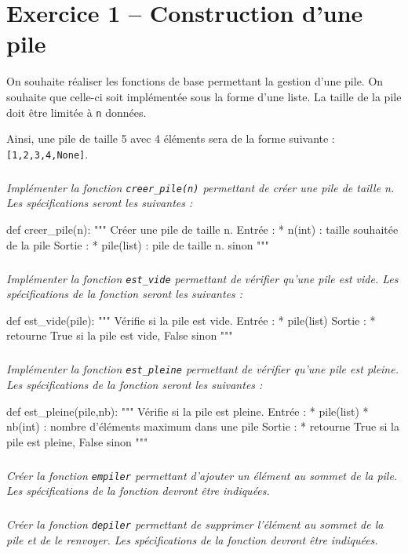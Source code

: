 
\section*{Exercice 1 -- Construction d'une pile}
On souhaite réaliser les fonctions de base permettant la gestion d'une pile. On souhaite que celle-ci soit implémentée sous la forme d'une liste. La taille de la pile doit être limitée à \texttt{n} données.

Ainsi, une pile de taille 5 avec 4 éléments sera de la forme suivante : \texttt{[1,2,3,4,None]}.

\subparagraph{}\textit{Implémenter la fonction \texttt{creer\_pile(n)} permettant de créer une pile de taille n.  Les spécifications seront les suivantes :}
\begin{py}
\begin{python}
def creer_pile(n):
    """
    Créer une pile de taille n.
    Entrée : 
     * n(int) : taille souhaitée de la pile
    Sortie : 
     * pile(list) : pile de taille n.
     sinon
    """
\end{python}
\end{py}

\subparagraph{}\textit{Implémenter la fonction \texttt{est\_vide} permettant de vérifier qu'une pile est vide. Les spécifications de la fonction seront les suivantes : }
\begin{py}
\begin{python}
def est_vide(pile):
    """
    Vérifie si la pile est vide.
    Entrée : 
     * pile(list)
    Sortie : 
     * retourne True si la pile est vide, False 
     sinon
    """
\end{python}
\end{py}
\subparagraph{}\textit{Implémenter la fonction \texttt{est\_pleine} permettant de vérifier qu'une pile est pleine. Les spécifications de la fonction seront les suivantes :}
\begin{py}
\begin{python}
def est_pleine(pile,nb):
    """
    Vérifie si la pile est pleine.
    Entrée : 
     * pile(list)
     * nb(int) : nombre d'éléments maximum dans une pile
    Sortie : 
     * retourne True si la pile est pleine, False 
     sinon
    """
\end{python}
\end{py}
\subparagraph{}\textit{Créer la fonction \texttt{empiler} permettant d'ajouter un élément au sommet de la pile. Les spécifications de la fonction devront être indiquées.}

\subparagraph{}\textit{Créer la fonction \texttt{depiler} permettant de supprimer l'élément au sommet de la pile et de le renvoyer. Les spécifications de la fonction devront être indiquées.}

